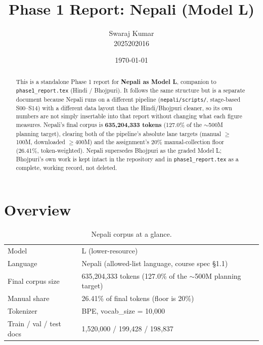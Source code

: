 \documentclass[11pt]{article}
\title{\textbf{Phase 1 Report: Nepali (Model L)}}
\author{Swaraj Kumar \\ \small 2025202016}
\date{\today}
\begin{document}
\maketitle

\begin{abstract}
\noindent
This is a standalone Phase 1 report for \textbf{Nepali as Model L},
companion to \texttt{phase1\_report.tex} (Hindi / Bhojpuri). It follows the
same structure but is a separate document because Nepali runs on a
different pipeline (\texttt{nepali/scripts/}, stage-based S00--S14) with a
different data layout than the Hindi/Bhojpuri cleaner, so its own numbers
are not simply insertable into that report without changing what each
figure measures. Nepali's final corpus is \textbf{635,204,333 tokens}
(127.0\% of the $\sim$500M planning target), clearing both of the
pipeline's absolute lane targets (manual $\geq$100M, downloaded
$\geq$400M) and the assignment's 20\% manual-collection floor
(26.41\%, token-weighted). Nepali supersedes Bhojpuri as the graded
Model L; Bhojpuri's own work is kept intact in the repository and in
\texttt{phase1\_report.tex} as a complete, working record, not deleted.
\end{abstract}

\tableofcontents
\newpage

\section{Overview}

\begin{table}[htbp]
\centering
\begin{tabular}{ll}
\toprule
Model & L (lower-resource) \\
Language & Nepali (allowed-list language, course spec \S1.1) \\
Final corpus size & 635{,}204{,}333 tokens (127.0\% of the $\sim$500M planning target) \\
Manual share & 26.41\% of final tokens (floor is 20\%) \\
Tokenizer & BPE, vocab\_size = 10{,}000 \\
Train / val / test docs & 1{,}520{,}000 / 199{,}428 / 198{,}837 \\
\bottomrule
\end{tabular}
\caption{Nepali corpus at a glance.}
\end{table}
\end{document}

